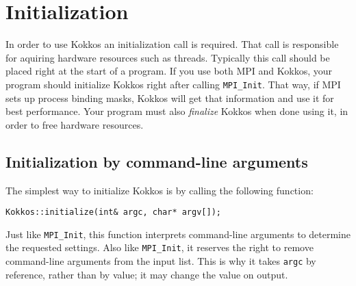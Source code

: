 
\section{Initialization}\label{C:init}

In order to use Kokkos an initialization call is required. 
That call is responsible for aquiring hardware resources such as threads. 
Typically this call should be placed right at the start of a program.
If you use both MPI and Kokkos, your program should initialize Kokkos right after calling \lstinline!MPI_Init!.
That way, if MPI sets up process binding masks,
Kokkos will get that information and use it for best performance.
Your program must also \emph{finalize} Kokkos when done using it,
in order to free hardware resources.


\subsection{Initialization by command-line arguments}\label{S:init:cmdline}

The simplest way to initialize Kokkos is by calling the following function:
\begin{lstlisting}
Kokkos::initialize(int& argc, char* argv[]); 
\end{lstlisting}
Just like \lstinline!MPI_Init!, this function interprets command-line arguments to determine the requested settings.
Also like \lstinline!MPI_Init!, it reserves the right to remove command-line arguments from the input list.
This is why it takes \lstinline!argc! by reference, rather than by value; it may change the value on output.

